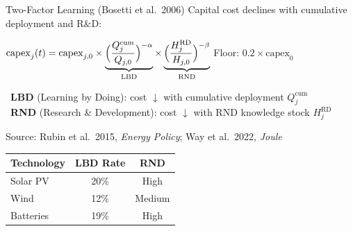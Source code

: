 \documentclass[aspectratio=169, 10pt]{beamer}
\begin{document}
\begin{frame}[t]{Two-Factor Learning (Bosetti et al.\ 2006)}
\small
Capital cost declines with cumulative deployment and R\&D:

\vspace{0.3em}
\centering
\large
$\mathrm{capex}_j(t) = \mathrm{capex}_{j,0} \times \underbrace{\Bigl(\dfrac{Q_j^{\mathrm{cum}}}{Q_{j,0}}\Bigr)^{-\alpha}}_{\text{LBD}} \times \underbrace{\Bigl(\dfrac{H_j^{\mathrm{RD}}}{H_{j,0}}\Bigr)^{-\beta}}_{\text{RND}}$
\hspace{1.5em}
\small Floor: $0.2 \times \mathrm{capex}_0$

\vspace{0.5em}
\flushleft
\small
\textbullet\ \textbf{LBD} (Learning by Doing): cost $\downarrow$ with cumulative deployment $Q_j^{\mathrm{cum}}$\\
\textbullet\ \textbf{RND} (Research \& Development): cost $\downarrow$ with RND knowledge stock $H_j^{\mathrm{RD}}$

\vspace{0.4em}
\centering
\scriptsize
Source: Rubin et al.\ 2015, \textit{Energy Policy}; Way et al.\ 2022, \textit{Joule}

\vspace{0.2em}
\begin{tabular}{l c c}
\toprule
\textbf{Technology} & \textbf{LBD Rate} & \textbf{RND} \\
\midrule
Solar PV     & 20\% & High \\
Wind         & 12\% & Medium \\
Batteries    & 19\% & High \\
\bottomrule
\end{tabular}

\end{frame}
\end{document}

